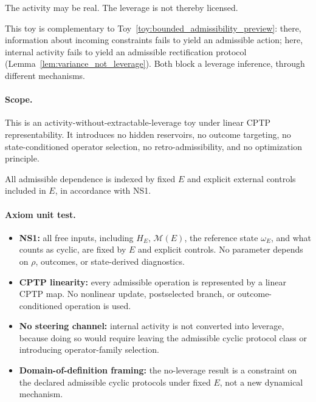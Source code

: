\documentclass[aps,prx,onecolumn,11pt]{revtex4-2}
\theoremstyle{plain}
\theoremstyle{definition}
\theoremstyle{remark}
\begin{document}
The activity may be real. The leverage is not thereby licensed.

This toy is complementary to
Toy~\ref{toy:bounded_admissibility_preview}: there, information
about incoming constraints fails to yield an admissible action; here,
internal activity fails to yield an admissible rectification protocol
(Lemma~\ref{lem:variance_not_leverage}). Both block a leverage
inference, through different mechanisms.

\paragraph{Scope.}

This is an activity-without-extractable-leverage toy under linear CPTP
representability. It introduces no hidden reservoirs, no outcome
targeting, no state-conditioned operator selection, no
retro-admissibility, and no optimization principle.

All admissible dependence is indexed by fixed \(E\) and explicit
external controls included in \(E\), in accordance with NS1.

\paragraph{Axiom unit test.}

\begin{itemize}[leftmargin=2em]
\item \textbf{NS1:} all free inputs, including \(H_E\),
\(\mathcal M(E)\), the reference state \(\omega_E\), and what counts as
cyclic, are fixed by \(E\) and explicit controls. No parameter depends
on \(\rho\), outcomes, or state-derived diagnostics.

\item \textbf{CPTP linearity:} every admissible operation is represented
by a linear CPTP map. No nonlinear update, postselected branch, or
outcome-conditioned operation is used.

\item \textbf{No steering channel:} internal activity is not converted
into leverage, because doing so would require leaving the admissible
cyclic protocol class or introducing operator-family selection.

\item \textbf{Domain-of-definition framing:} the no-leverage result is
a constraint on the declared admissible cyclic protocols under fixed
\(E\), not a new dynamical mechanism.
\end{itemize}
\end{document}

